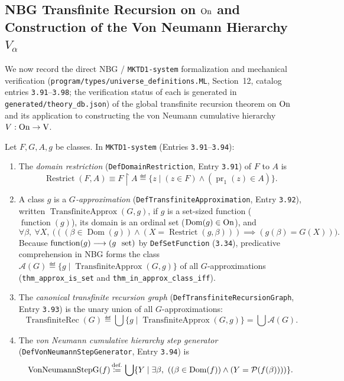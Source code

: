 \subsection{NBG Transfinite Recursion on $\mathrm{On}$ and Construction of the Von Neumann Hierarchy $V_\alpha$}

We now record the direct NBG / \texttt{MKTD1-system} formalization and mechanical verification (\texttt{program/types/universe\_definitions.ML}, Section~12, catalog entries \texttt{3.91}--\texttt{3.98}; the verification status of each is generated in \texttt{generated/theory\_db.json}) of the global transfinite recursion theorem on $\mathrm{On}$ and its application to constructing the von Neumann cumulative hierarchy $V : \mathrm{On} \to \mathrm{V}$.

\begin{definition}
Let $F, G, A, g$ be classes. In \texttt{MKTD1-system} (Entries \texttt{3.91}--\texttt{3.94}):
\begin{enumerate}
\item The \emph{domain restriction} (\texttt{DefDomainRestriction}, Entry \texttt{3.91}) of $F$ to $A$ is
\[
\operatorname{Restrict}(F, A) \equiv F \upharpoonright A \eqdef \{z \mid (z \in F) \land (\operatorname{pr}_1(z) \in A)\}.
\]
\item A class $g$ is a \emph{$G$-approximation} (\texttt{DefTransfiniteApproximation}, Entry \texttt{3.92}), written $\operatorname{TransfiniteApprox}(G, g)$, if $g$ is a set-sized function ($\operatorname{function}(g)$), its domain is an ordinal set ($\operatorname{Dom}(g) \in \mathrm{On}$), and
\[
\forall \beta,\ \forall X,\ \bigl(((\beta \in \operatorname{Dom}(g)) \land (X = \operatorname{Restrict}(g, \beta))) \implies (g(\beta) = G(X))\bigr).
\]
Because $\operatorname{function}(g) \longrightarrow (g\ \mathrm{\ set})$ by \texttt{DefSetFunction} (\texttt{3.34}), predicative comprehension in NBG forms the class $\mathcal{A}(G) \eqdef \{g \mid \operatorname{TransfiniteApprox}(G, g)\}$ of all $G$-approximations (\texttt{thm\_approx\_is\_set} and \texttt{thm\_in\_approx\_class\_iff}).
\item The \emph{canonical transfinite recursion graph} (\texttt{DefTransfiniteRecursionGraph}, Entry \texttt{3.93}) is the unary union of all $G$-approximations:
\[
\operatorname{TransfiniteRec}(G) \eqdef \bigcup \{g \mid \operatorname{TransfiniteApprox}(G, g)\} = \bigcup \mathcal{A}(G).
\]
\item The \emph{von Neumann cumulative hierarchy step generator} (\texttt{DefVonNeumannStepGenerator}, Entry \texttt{3.94}) is
\[
\operatorname{VonNeumannStepG}(f) \,{\stackrel{{\textrm{def.}}}{\coloneqq}}\, \bigcup \{Y \mid \exists \beta,\ ((\beta \in \operatorname{Dom}(f)) \land (Y = \mathcal{P}(f(\beta))))\}.
\]
\end{enumerate}
\end{definition}

